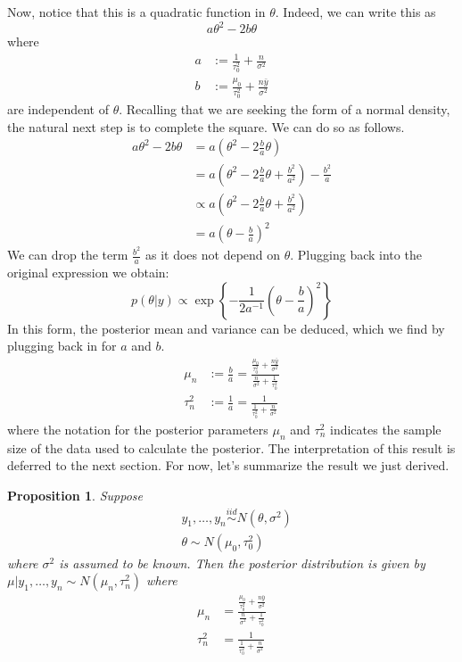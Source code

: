 \documentclass[12pt]{article}
\newtheorem{prop}{Proposition}
\begin{document}
Now, notice that this is a quadratic function in $\theta$. Indeed, we can write this as 
\[a\theta^2 - 2b\theta\]
where 
\begin{align*}
a &:= \frac{1}{\tau_0^2} + \frac{n}{\sigma^2} \\
b &:= \frac{\mu_0}{\tau_0^2} + \frac{n \bar{y}}{\sigma^2}
\end{align*}
are independent of $\theta$. Recalling that we are seeking the form of a normal density, the natural next step is to complete the square. We can do so as follows. 
\begin{align*}
a\theta^2 - 2b\theta &= a\left(\theta^2 - 2\frac{b}{a} \theta \right) \\
		 	       &= a\left(\theta^2 - 2\frac{b}{a} \theta + \frac{b^2}{a^2} \right) - \frac{b^2}{a} \\
			       &\propto a\left(\theta^2 - 2\frac{b}{a} \theta + \frac{b^2}{a^2} \right) \\
			       &= a\left(\theta - \frac{b}{a}\right)^2
\end{align*}
We can drop the term $\frac{b^2}{a}$ as it does not depend on $\theta$. Plugging back into the original expression we obtain: 
\[p(\theta|y) \propto \exp\left\{-\frac{1}{2a^{-1}} \left(\theta - \frac{b}{a}\right)^2 \right\}\]
In this form, the posterior mean and variance can be deduced, which we find by plugging back in for $a$ and $b$. 
\begin{align*}
\mu_n &:= \frac{b}{a} = \frac{\frac{\mu_0}{\tau_0^2} + \frac{n\bar{y}}{\sigma^2}}{\frac{n}{\sigma^2} + \frac{1}{\tau_0^2}} \\
\tau_n^2 &:= \frac{1}{a} = \frac{1}{\frac{1}{\tau_0^2} + \frac{n}{\sigma^2}}
\end{align*}
where the notation for the posterior parameters $\mu_n$ and $\tau_n^2$ indicates the sample size of the data used to calculate the posterior. The interpretation of this result is 
deferred to the next section. For now, let's summarize the result we just derived. 
\begin{prop}
Suppose 
\begin{align*}
&y_1, \dots, y_n \overset{iid}{\sim} N(\theta, \sigma^2) \\
&\theta \sim N(\mu_0, \tau_0^2)
\end{align*}
where $\sigma^2$ is assumed to be known. Then the posterior distribution is given by $\mu|y_1, \dots, y_n \sim N(\mu_n, \tau_n^2)$ where 
\begin{align*}
\mu_n &=\frac{\frac{\mu_0}{\tau_0^2} + \frac{n\bar{y}}{\sigma^2}}{\frac{n}{\sigma^2} + \frac{1}{\tau_0^2}} \\
\tau_n^2 &= \frac{1}{\frac{1}{\tau_0^2} + \frac{n}{\sigma^2}}
\end{align*}
\end{prop}
\end{document}
